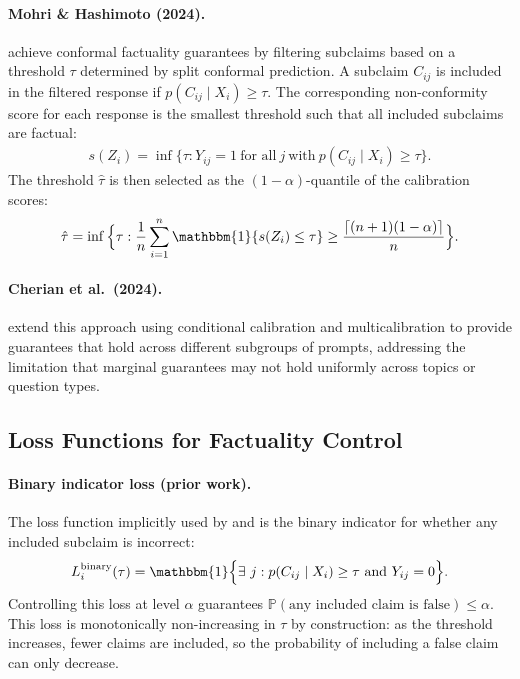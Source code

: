 \paragraph{Mohri \& Hashimoto (2024).} \citet{mohri2024language} achieve conformal factuality guarantees by filtering subclaims based on a threshold $\tau$ determined by split conformal prediction. A subclaim $C_{ij}$ is included in the filtered response if $p(C_{ij} \mid X_i) \geq \tau$. The corresponding non-conformity score for each response is the smallest threshold such that all included subclaims are factual:
\begin{align}
    s(Z_i) = \inf\big\{\tau : Y_{ij} = 1 \ \text{for all} \ j \ \text{with} \ p(C_{ij} \mid X_i) \geq \tau \big\}.
\end{align}
The threshold $\hat{\tau}$ is then selected as the $(1-\alpha)$-quantile of the calibration scores:
\begin{align}
    \hat{\tau} = \inf \Big\{\tau : \frac{1}{n}\sum_{i=1}^n\mathbbm{1}\{s(Z_i) \leq \tau\} \geq \frac{\lceil(n+1)(1-\alpha)\rceil}{n}\Big\}.
\end{align}

\paragraph{Cherian et al.\ (2024).} \citet{cherian2024large} extend this approach using conditional calibration and multicalibration to provide guarantees that hold across different subgroups of prompts, addressing the limitation that marginal guarantees may not hold uniformly across topics or question types.

\subsection{Loss Functions for Factuality Control}
\label{subsec:medqa_loss_functions}

\paragraph{Binary indicator loss (prior work).} The loss function implicitly used by \citet{mohri2024language} and \citet{cherian2024large} is the binary indicator for whether any included subclaim is incorrect:
\begin{align}
    L_i^{\text{binary}}(\tau) = \mathbbm{1}\Big\{\exists \ j : p(C_{ij} \mid X_i) \geq \tau \ \text{and} \ Y_{ij} = 0\Big\}.
\end{align}
Controlling this loss at level $\alpha$ guarantees $\mathbb{P}(\text{any included claim is false}) \leq \alpha$. This loss is monotonically non-increasing in $\tau$ by construction: as the threshold increases, fewer claims are included, so the probability of including a false claim can only decrease.

